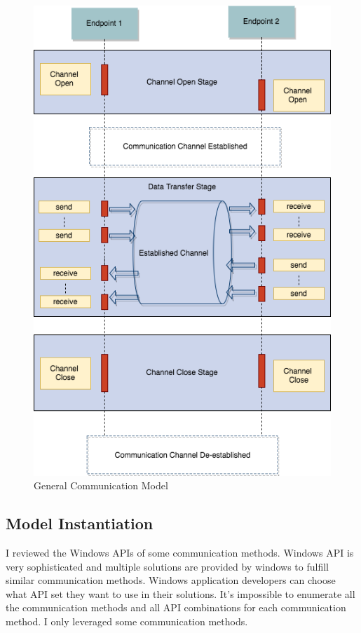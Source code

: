 \begin{figure}[H]
\centerline{\includegraphics[scale=0.55]{Figures/communicationhappen}}
 \caption{General Communication Model}
\label{communicationhappen}
\end{figure}

\subsection{Model Instantiation}
I reviewed the Windows APIs of some communication methods. Windows API is very sophisticated
and multiple solutions are provided by windows to fulfill similar communication methods.
Windows application developers can choose what API set they want to use in their solutions. It’s
impossible to enumerate all the communication methods and all API combinations for each communication method. I only leveraged some communication methods. 

